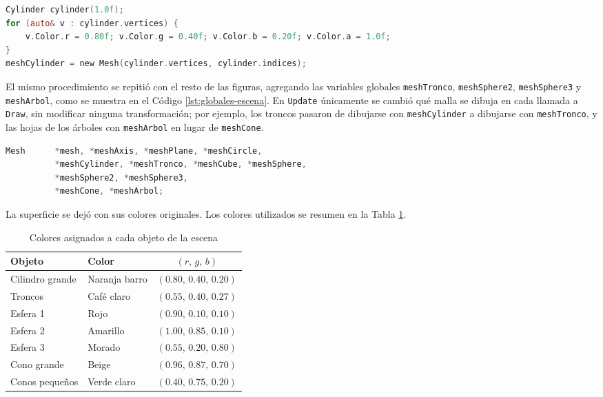 \begin{lstlisting}[language=C, caption={Asignacion de color a todos los vertices del cilindro grande}, label=lst:colores-escena]
Cylinder cylinder(1.0f);
for (auto& v : cylinder.vertices) {
    v.Color.r = 0.80f; v.Color.g = 0.40f; v.Color.b = 0.20f; v.Color.a = 1.0f;
}
meshCylinder = new Mesh(cylinder.vertices, cylinder.indices);
\end{lstlisting}

El mismo procedimiento se repitió con el resto de las figuras, agregando las
variables globales \texttt{meshTronco}, \texttt{meshSphere2},
\texttt{meshSphere3} y \texttt{meshArbol}, como se muestra en el Código
\ref{lst:globales-escena}. En \texttt{Update} únicamente se cambió qué malla
se dibuja en cada llamada a \texttt{Draw}, sin modificar ninguna
transformación; por ejemplo, los troncos pasaron de dibujarse con
\texttt{meshCylinder} a dibujarse con \texttt{meshTronco}, y las hojas de los
árboles con \texttt{meshArbol} en lugar de \texttt{meshCone}.

\begin{lstlisting}[language=C, caption={Declaracion de las mallas de la escena}, label=lst:globales-escena]
Mesh      *mesh, *meshAxis, *meshPlane, *meshCircle, 
          *meshCylinder, *meshTronco, *meshCube, *meshSphere,
          *meshSphere2, *meshSphere3,
          *meshCone, *meshArbol;
\end{lstlisting}

La superficie se dejó con sus colores originales. Los colores utilizados se
resumen en la Tabla \ref{tab:colores-escena}.

\begin{table}[H]
    \centering
    \begin{tabular}{l l c}
        \toprule
        Objeto & Color & $(r,\,g,\,b)$ \\
        \midrule
        Cilindro grande & Naranja barro & $(0.80,\,0.40,\,0.20)$ \\
        Troncos & Café claro & $(0.55,\,0.40,\,0.27)$ \\
        Esfera 1 & Rojo & $(0.90,\,0.10,\,0.10)$ \\
        Esfera 2 & Amarillo & $(1.00,\,0.85,\,0.10)$ \\
        Esfera 3 & Morado & $(0.55,\,0.20,\,0.80)$ \\
        Cono grande & Beige & $(0.96,\,0.87,\,0.70)$ \\
        Conos pequeños & Verde claro & $(0.40,\,0.75,\,0.20)$ \\
        \bottomrule
    \end{tabular}
    \caption{Colores asignados a cada objeto de la escena}
    \label{tab:colores-escena}
\end{table}